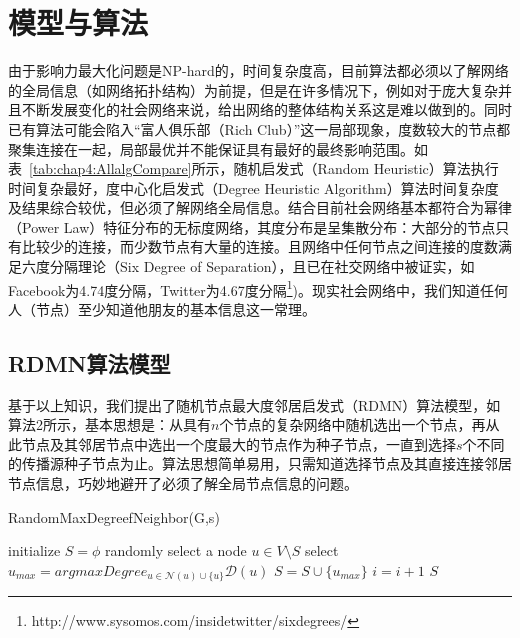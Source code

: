 \section{模型与算法}
由于影响力最大化问题是NP-hard的，时间复杂度高，目前算法都必须以了解网络的全局信息（如网络拓扑结构）为前提，但是在许多情况下，例如对于庞大复杂并且不断发展变化的社会网络来说，给出网络的整体结构关系这是难以做到的。同时已有算法可能会陷入“富人俱乐部（Rich Club）”这一局部现象，度数较大的节点都聚集连接在一起，局部最优并不能保证具有最好的最终影响范围。如表~\ref{tab:chap4:AllalgCompare}所示，随机启发式（Random Heuristic）算法执行时间复杂最好，度中心化启发式（Degree Heuristic Algorithm）算法时间复杂度及结果综合较优，但必须了解网络全局信息。结合目前社会网络基本都符合为幂律（Power Law）特征分布的无标度网络\cite{barabasi1999emergence,adamic2000power,gabaix2003theory,clauset2009power}，其度分布是呈集散分布：大部分的节点只有比较少的连接，而少数节点有大量的连接。且网络中任何节点之间连接的度数满足六度分隔理论\cite{milgram1967small,guare1990six,kiermer2006six}（Six Degree of Separation），且已在社交网络中被证实，如 Facebook为4.74度分隔\cite{backstrom2012four}，Twitter为4.67度分隔\footnote{http://www.sysomos.com/insidetwitter/sixdegrees/})。现实社会网络中，我们知道任何人（节点）至少知道他朋友的基本信息这一常理。
\subsection{RDMN算法模型}
基于以上知识，我们提出了随机节点最大度邻居启发式（RDMN）算法模型，如算法2所示，基本思想是：从具有$n$个节点的复杂网络中随机选出一个节点，再从此节点及其邻居节点中选出一个度最大的节点作为种子节点，一直到选择$s$个不同的传播源种子节点为止。算法思想简单易用，只需知道选择节点及其直接连接邻居节点信息，巧妙地避开了必须了解全局节点信息的问题。
\begin{algorithm}
	\caption{RandomMaxDegreefNeighbor(G,s)}
	\label{alg:chap4:RandomMaxDegreefNeighbor}
	\begin{algorithmic}[1]
		\STATE initialize $S = \phi$
		\STATE randomly select a node $u \in V\setminus S$ 
		\STATE select $u_{max} = argmaxDegree_{u \in \mathcal{N}(u) \cup \{u\}} \mathcal{D}(u)$
		\STATE $S = S \cup \{u_{max}\}$
		\STATE $i = i + 1$
		\ENDWHILE
		\RETURN $S$
	\end{algorithmic}
\end{algorithm}

